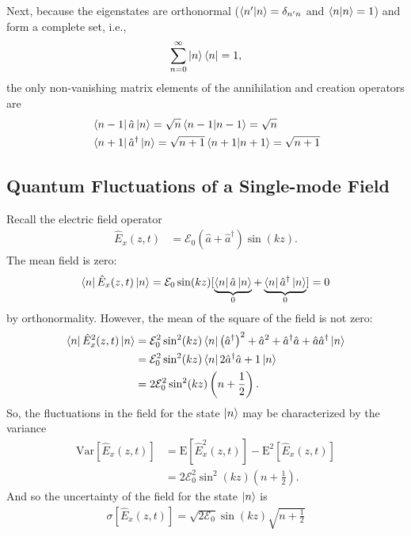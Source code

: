 \documentclass{book}
\theoremstyle{definition}
\newcommand{\f}[2]{\frac{#1}{#2}}
\newcommand{\lp}{\left(}
\newcommand{\rp}{\right)}
\begin{document}
Next, because the eigenstates are orthonormal ($\braket{n'}{n} = \delta_{n'n}$ and $\braket{n}=1$) and form a complete set, i.e.,
\begin{align}
\sum^\infty_{n=0}\ket{n}\bra{n} = 1,
\end{align} 
the only non-vanishing matrix elements of the annihilation and creation operators are
\begin{align}
&\bra{n-1}\hat{a}\ket{n} = \sqrt{n}\braket{n-1} = \sqrt{n} \\
&\bra{n+1}\hat{a}^\dagger\ket{n} = \sqrt{n+1}\braket{n+1} = \sqrt{n+1}
\end{align}



\subsection{Quantum Fluctuations of a Single-mode Field}
Recall the electric field operator
\begin{align}
\hat{E}_x(z,t) &= \mathcal{E}_0(\hat{a} + \hat{a}^\dagger)\sin(kz).
\end{align}
The mean field is zero:
\begin{align}
\bra{n}\hat{E}_x(z,t)\ket{n} = \mathcal{E}_0\sin(kz)[\underbrace{\bra{n}\hat{a}\ket{n}}_{0} + \underbrace{\bra{n}\hat{a}^\dagger\ket{n}}_{0}] = 0
\end{align}
by orthonormality. However, the mean of the square of the field is not zero:
\begin{align}
\bra{n}\hat{E}^2_x(z,t)\ket{n} &= \mathcal{E}^2_0\sin^2(kz)\bra{n}{\lp\hat{a}^\dagger\rp}^2 + \hat{a}^2 + \hat{a}^\dagger\hat{a}+ \hat{a}\hat{a}^\dagger\ket{n}\\
&= \mathcal{E}^2_0\sin^2(kz)\bra{n} 2\hat{a}^\dagger\hat{a} + 1  \ket{n} \\
&= 2\mathcal{E}^2_0\sin^2(kz)\lp n + \f{1}{2}\rp.
\end{align}
So, the fluctuations in the field for the state $\ket{n}$ may be characterized by the variance
\begin{align}
\text{Var}[\hat{E}_x(z,t)] &= \text{E}[\hat{E}^2_x(z,t)] - \text{E}^2[\hat{E}_x(z,t)] \\ &= 2\mathcal{E}^2_0\sin^2(kz)\lp n + \f{1}{2}\rp.
\end{align}
And so the uncertainty of the field for the state $\ket{n}$ is
\begin{align}
\boxed{\sigma[\hat{E}_x(z,t)]= \sqrt{2\mathcal{E}_0}\sin(kz)\sqrt{n+ \f{1}{2}}}
\end{align}
\end{document}
